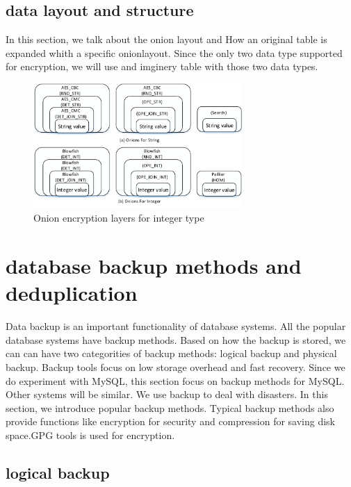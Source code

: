 \subsection{data layout and structure}

In this section, we talk about the onion layout and How an original table is expanded whith a specific onionlayout. Since the only two data type supported for encryption, we will use and imginery table with those two data types. 



\begin{figure}[tb]
\centering
\includegraphics[width=8cm]{images/Onions.pdf}
\caption{Onion encryption layers for integer type}
\label{fig:stack3}
\end{figure}


\section{database backup methods and deduplication}

Data backup is an important functionality of database systems. All the popular database systems have backup methods. Based on how the backup is stored, we can can have two categorities of backup methods: logical backup and physical backup. Backup tools focus on low storage overhead and fast recovery. Since we do experiment with MySQL, this section focus on backup methods for MySQL. Other systems will be similar. We use backup to deal with disasters. In this section, we introduce popular backup methods. Typical backup methods also provide functions like encryption for security and compression for saving disk space.GPG tools is used for encryption.



\subsection{logical backup}

